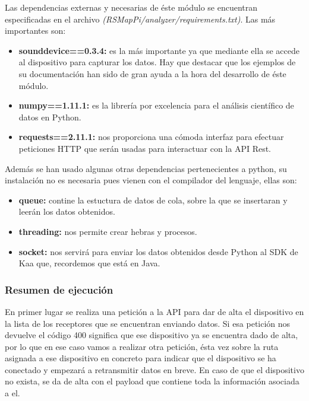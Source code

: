 Las dependencias externas y necesarias de éste módulo se encuentran especificadas en el archivo \textit{(RSMapPi/\/analyzer/\/requirements.txt)}. Las más importantes son:

\begin{itemize}
	\item \textbf{sounddevice==0.3.4:} es la más importante ya que mediante ella se accede al dispositivo para capturar los datos. Hay que destacar que los ejemplos de su documentación han sido de gran ayuda a la hora del desarrollo de éste módulo.
	\item \textbf{numpy==1.11.1:} es la librería por excelencia para el análisis científico de datos en Python.
	\item \textbf{requests==2.11.1:} nos proporciona una cómoda interfaz para efectuar peticiones HTTP que serán usadas para interactuar con la API Rest.
\end{itemize}

\newpage

Además se han usado algunas otras dependencias pertenecientes a python, su instalación no es necesaria pues vienen con el compilador del lenguaje, ellas son:

\begin{itemize}
	\item \textbf{queue:} contine la estuctura de datos de cola, sobre la que se insertaran y leerán los datos obtenidos.
	\item \textbf{threading:} nos permite crear hebras y procesos.
	\item \textbf{socket:} nos servirá para enviar los datos obtenidos desde Python al SDK de Kaa que, recordemos que está en Java.
\end{itemize}

\bigskip

\subsubsection{Resumen de ejecución}

\bigskip

En primer lugar se realiza una petición a la API para dar de alta el dispositivo en la lista de los receptores que se encuentran enviando datos. Si esa petición nos devuelve el código 400 significa que ese dispositivo ya se encuentra dado de alta, por lo que en ese caso vamos a realizar otra petición, ésta vez sobre la ruta asignada a ese dispositivo en concreto para indicar que el dispositivo se ha conectado y empezará a retransmitir datos en breve. En caso de que el dispositivo no exista, se da de alta con el payload que contiene toda la información asociada a el.

